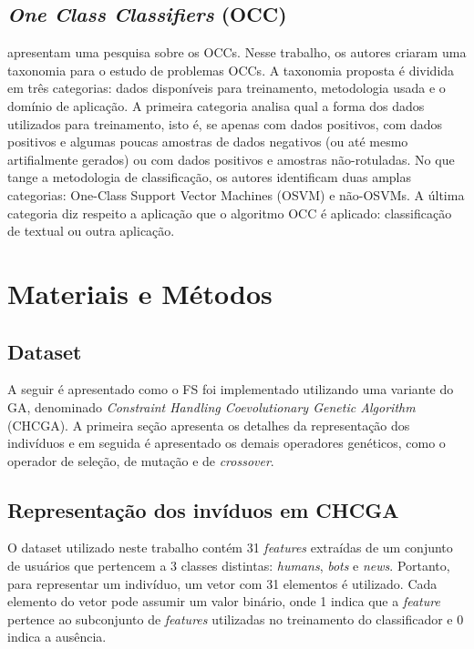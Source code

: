 \documentclass{paper}
\begin{document}
\subsection{{\itshape One Class Classifiers} (OCC)}
\citet{Khan2014} apresentam uma pesquisa sobre os OCCs. Nesse trabalho, os
autores criaram uma taxonomia para o estudo de problemas OCCs. A taxonomia
proposta é dividida em três categorias: dados disponíveis para treinamento,
metodologia usada e o domínio de aplicação. A primeira categoria analisa qual a
forma dos dados utilizados para treinamento, isto é, se apenas com dados
positivos, com dados positivos e algumas poucas amostras de dados negativos (ou
até mesmo artifialmente gerados) ou com dados positivos e amostras
não-rotuladas. No que tange a metodologia de classificação, os autores
identificam duas amplas categorias: One-Class Support Vector Machines (OSVM) e
não-OSVMs. A última categoria diz respeito a aplicação que o algoritmo OCC é
aplicado: classificação de textual ou outra aplicação.

\section{Materiais e Métodos} \label{sec_metodo}
\subsection{Dataset}

A seguir é apresentado como o FS foi implementado utilizando uma variante do GA,
denominado \textit{Constraint Handling Coevolutionary Genetic Algorithm}
(CHCGA). A primeira seção apresenta os detalhes da representação dos indivíduos
e em seguida é apresentado os demais operadores genéticos, como o operador de
seleção, de mutação e de \textit{crossover}.

\subsection{Representação dos invíduos em CHCGA}
O dataset utilizado neste trabalho contém 31 \textit{features} extraídas de um
conjunto de usuários que pertencem a 3 classes distintas: \textit{humans},
\textit{bots} e \textit{news}. Portanto, para representar um indivíduo, um vetor
com 31 elementos é utilizado. Cada elemento do vetor pode assumir um valor
binário, onde 1 indica que a \textit{feature} pertence ao subconjunto de
\textit{features} utilizadas no treinamento do classificador e 0 indica a
ausência.
\end{document}
